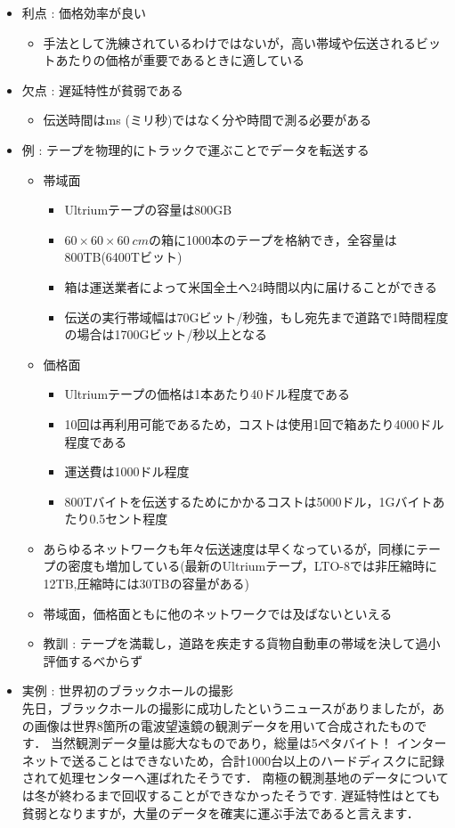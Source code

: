 \documentclass[a4paper]{ltjsarticle}
\begin{document}
			\begin{itemize}
				\item 利点 : 価格効率が良い
				\begin{itemize}
					\item 手法として洗練されているわけではないが，高い帯域や伝送されるビットあたりの価格が重要であるときに適している
				\end{itemize}
				\item 欠点 : 遅延特性が貧弱である
				\begin{itemize}
					\item 伝送時間は\si{ms} (ミリ秒)ではなく分や時間で測る必要がある
				\end{itemize}
				\item 例 : テープを物理的にトラックで運ぶことでデータを転送する
				\begin{itemize}
					\item 帯域面
					\begin{itemize}
						\item Ultriumテープの容量は800GB
						\item $60 \times 60 \times \SI{60}{cm}$の箱に1000本のテープを格納でき，全容量は800TB(6400Tビット)
						\item 箱は運送業者によって米国全土へ24時間以内に届けることができる
						\item 伝送の実行帯域幅は70Gビット/秒強，もし宛先まで道路で1時間程度の場合は1700Gビット/秒以上となる
					\end{itemize}
					\item 価格面
					\begin{itemize}
						\item Ultriumテープの価格は1本あたり40ドル程度である
						\item 10回は再利用可能であるため，コストは使用1回で箱あたり4000ドル程度である
						\item 運送費は1000ドル程度
						\item 800Tバイトを伝送するためにかかるコストは5000ドル，1Gバイトあたり0.5セント程度
					\end{itemize}
					\item あらゆるネットワークも年々伝送速度は早くなっているが，同様にテープの密度も増加している(最新のUltriumテープ，LTO-8では非圧縮時に12TB,圧縮時には30TBの容量がある)
					\item 帯域面，価格面ともに他のネットワークでは及ばないといえる
					\item 教訓 : テープを満載し，道路を疾走する貨物自動車の帯域を決して過小評価するべからず
				\end{itemize}
				\item 実例 : 世界初のブラックホールの撮影\\
					先日，ブラックホールの撮影に成功したというニュースがありましたが，あの画像は世界8箇所の電波望遠鏡の観測データを用いて合成されたものです．
					当然観測データ量は膨大なものであり，総量は5ペタバイト！
					インターネットで送ることはできないため，合計1000台以上のハードディスクに記録されて処理センターへ運ばれたそうです．
					南極の観測基地のデータについては冬が終わるまで回収することができなかったそうです.
					遅延特性はとても貧弱となりますが，大量のデータを確実に運ぶ手法であると言えます．
			\end{itemize}
\end{document}
